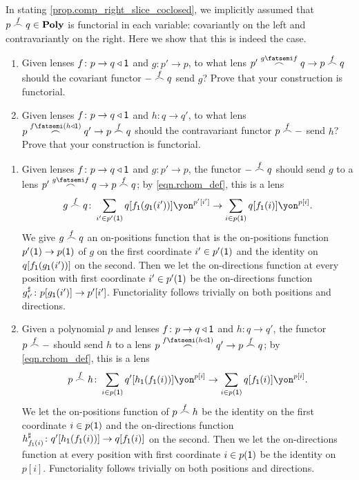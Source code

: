 \documentclass[Book-Poly]{subfiles}
\begin{document}
\begin{exercise} \label{exc.rchom_func}
In stating \cref{prop.comp_right_slice_coclosed}, we implicitly assumed that $p\overset{f}{\frown}q\in\mathbf{Poly}$ is functorial in each variable: covariantly on the left and contravariantly on the right.
Here we show that this is indeed the case.
\begin{enumerate}
    \item Given lenses $f\colon p\to q\mathbin{\triangleleft}\textsf{1}$ and $g\colon p'\to p$, to what lens $p'\rchom{g\then f}q\to p\rchom{f}q$ should the covariant functor $-\overset{f}{\frown}q$ send $g$?
    Prove that your construction is functorial.

    \item Given lenses $f\colon p\to q\mathbin{\triangleleft}\textsf{1}$ and $h\colon q\to q'$, to what lens $p\rchom{f\then(h\tri\1)}q'\to p\rchom{f}q$ should the contravariant functor $p\overset{f}{\frown}-$ send $h$?
    Prove that your construction is functorial.
    \qedhere
\end{enumerate}
\begin{solution}
\begin{enumerate}
    \item Given lenses $f\colon p\to q\mathbin{\triangleleft}\textsf{1}$ and $g\colon p'\to p$, the functor $-\overset{f}{\frown}q$ should send $g$ to a lens $p'\rchom{g\then f}q\to p\rchom{f}q$; by \eqref{eqn.rchom_def}, this is a lens
    \[
        g\rchom{f}q\colon\sum_{i'\in p'(\1)}q[f_\1(g_\1(i'))]\yon^{p'[i']}\to\sum_{i\in p(\1)}q[f_\1(i)]\yon^{p[i]}.
    \]
    We give $g\overset{f}{\frown}q$ an on-positions function that is the on-positions function $p'(\textsf{1})\to p(\textsf{1})$ of $g$ on the first coordinate $i'\in p'(\textsf{1})$ and the identity on $q[f_{\textsf{1}}(g_{\textsf{1}}(i'))]$ on the second.
    Then we let the on-directions function at every position with first coordinate $i'\in p'(\textsf{1})$ be the on-directions function $g^\sharp_{i'}\colon p[g_{\textsf{1}}(i')]\to p'[i']$.
    Functoriality follows trivially on both positions and directions.

    \item Given a polynomial $p$ and lenses $f\colon p\to q\mathbin{\triangleleft}\textsf{1}$ and $h\colon q\to q'$, the functor $p\overset{f}{\frown}-$ should send $h$ to a lens $p\rchom{f\then(h\tri\1)}q'\to p\rchom{f}q$; by \eqref{eqn.rchom_def}, this is a lens
    \[
        p\rchom{f}h\colon\sum_{i\in p(\1)}q'[h_\1(f_\1(i))]\yon^{p[i]}\to\sum_{i\in p(\1)}q[f_\1(i)]\yon^{p[i]}.
    \]
    We let the on-positions function of $p\overset{f}{\frown}h$ be the identity on the first coordinate $i\in p(\textsf{1})$ and the on-directions function $h^\sharp_{f_{\textsf{1}}(i)}\colon q'[h_{\textsf{1}}(f_{\textsf{1}}(i))]\to q[f_{\textsf{1}}(i)]$ on the second.
    Then we let the on-directions function at every position with first coordinate $i\in p(\textsf{1})$ be the identity on $p[i]$.
    Functoriality follows trivially on both positions and directions.
\end{enumerate}
\end{solution}
\end{exercise}
\end{document}
